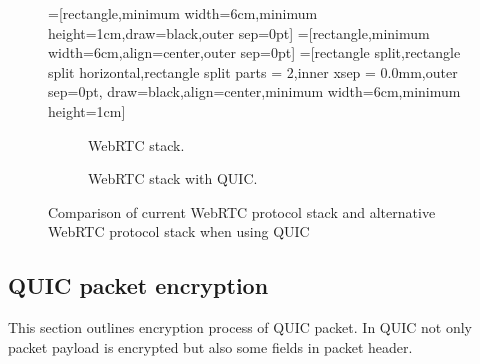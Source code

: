 \begin{figure}
    \centering
    =[rectangle,minimum width=6cm,minimum height=1cm,draw=black,outer sep=0pt]
    =[rectangle,minimum width=6cm,align=center,outer sep=0pt]
    =[rectangle split,rectangle split horizontal,rectangle split parts = 2,inner xsep = 0.0mm,outer sep=0pt,
    draw=black,align=center,minimum width=6cm,minimum height=1cm]
    \begin{subfigure}[b]{0.4\textwidth}
        \caption{WebRTC stack.}
        \label{fig:webrtc-stack-comparision-standard}
    \end{subfigure}
    \hfill
    \begin{subfigure}[b]{0.4\textwidth}
        \caption{WebRTC stack with QUIC.}
        \label{fig:webrtc-stack-comparision-quic}
    \end{subfigure}
    \caption{Comparison of current WebRTC protocol stack and alternative WebRTC protocol stack when using QUIC}
    \label{fig:webrtc-stack-comparision}
\end{figure}

\subsection{QUIC packet encryption}
\label{subsec:packet-encryption}
This section outlines encryption process of QUIC packet.
In QUIC not only packet payload is encrypted but also some fields in packet header.

